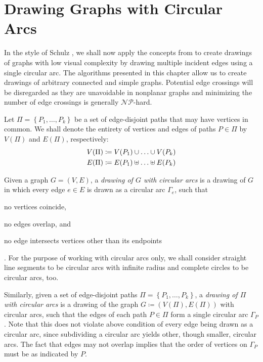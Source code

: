 \chapter{Drawing Graphs with Circular Arcs}
\label{chap:drawing-graphs-with-circular-arcs}

In the style of Schulz \cite{Schulz}, we shall now apply the concepts from  to create drawings of graphs with low visual complexity by drawing multiple incident edges using a single circular arc. The algorithms presented in this chapter allow us to create drawings of arbitrary connected and simple graphs. Potential edge crossings will be disregarded as they are unavoidable in nonplanar graphs and minimizing the number of edge crossings is generally ${\mathcal{NP}}$-hard.

\hfill

\noindent
Let ${\Pi = \left\lbrace P_1, \ldots, P_k \right\rbrace}$ be a set of edge-disjoint paths that may have vertices in common. We shall denote the entirety of vertices and edges of paths ${P \in \Pi}$ by ${V(\Pi)}$ and ${E(\Pi)}$, respectively:
%
\begin{align*}
  V(\Pi) &\coloneqq V(P_1) \cup \ldots \cup V(P_k)
  \\
  E(\Pi) &\coloneqq E(P_1) \uplus \ldots \uplus E(P_k)
\end{align*}






\noindent
Given a graph ${G = (V, E)}$, a \emph{drawing of ${G}$ with circular arcs} is a drawing of ${G}$ in which every edge ${e \in E}$ is drawn as a circular arc ${\Gamma_e}$, such that \begin{enumerate*}[label=(\roman*)] \item no vertices coincide, \item no edges overlap, and \item no edge intersects vertices other than its endpoints \end{enumerate*}. For the purpose of working with circular arcs only, we shall consider straight line segments to be circular arcs with infinite radius and complete circles to be circular arcs, too.

Similarly, given a set of edge-disjoint paths ${\Pi = \left\lbrace P_1, \ldots, P_k \right\rbrace}$, a \emph{drawing of ${\Pi}$ with circular arcs} is a drawing of the graph ${G \coloneqq (V(\Pi), E(\Pi))}$ with circular arcs, such that the edges of each path ${P \in \Pi}$ form a single circular arc ${\Gamma_P}$. Note that this does not violate above condition of every edge being drawn as a circular arc, since subdividing a circular arc yields other, though smaller, circular arcs. The fact that edges may not overlap implies that the order of vertices on ${\Gamma_P}$ must be as indicated by ${P}$.

